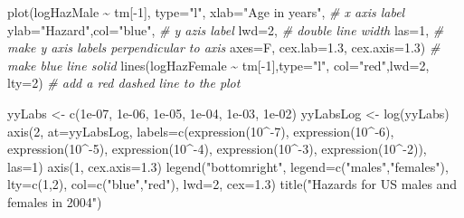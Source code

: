 \documentclass[
]{book}
\newenvironment{Shaded}{\begin{snugshade}}{\end{snugshade}}
\newcommand{\AttributeTok}[1]{\textcolor[rgb]{0.77,0.63,0.00}{#1}}
\newcommand{\CommentTok}[1]{\textcolor[rgb]{0.56,0.35,0.01}{\textit{#1}}}
\newcommand{\DecValTok}[1]{\textcolor[rgb]{0.00,0.00,0.81}{#1}}
\newcommand{\FloatTok}[1]{\textcolor[rgb]{0.00,0.00,0.81}{#1}}
\newcommand{\FunctionTok}[1]{\textcolor[rgb]{0.00,0.00,0.00}{#1}}
\newcommand{\NormalTok}[1]{#1}
\newcommand{\OtherTok}[1]{\textcolor[rgb]{0.56,0.35,0.01}{#1}}
\newcommand{\SpecialCharTok}[1]{\textcolor[rgb]{0.00,0.00,0.00}{#1}}
\newcommand{\StringTok}[1]{\textcolor[rgb]{0.31,0.60,0.02}{#1}}
\theoremstyle{definition}
\theoremstyle{definition}
\theoremstyle{definition}
\theoremstyle{definition}
\theoremstyle{remark}
\begin{document}
\begin{Shaded}
\begin{Highlighting}[]
\FunctionTok{plot}\NormalTok{(logHazMale }\SpecialCharTok{\textasciitilde{}}\NormalTok{ tm[}\SpecialCharTok{{-}}\DecValTok{1}\NormalTok{], }\AttributeTok{type=}\StringTok{"l"}\NormalTok{,}
     \AttributeTok{xlab=}\StringTok{"Age in years"}\NormalTok{,           }\CommentTok{\# x axis label}
     \AttributeTok{ylab=}\StringTok{"Hazard"}\NormalTok{,}\AttributeTok{col=}\StringTok{"blue"}\NormalTok{,      }\CommentTok{\# y azis label}
     \AttributeTok{lwd=}\DecValTok{2}\NormalTok{,                         }\CommentTok{\# double line width}
     \AttributeTok{las=}\DecValTok{1}\NormalTok{,                         }\CommentTok{\# make y axis labels perpendicular to axis}
     \AttributeTok{axes=}\NormalTok{F, }\AttributeTok{cex.lab=}\FloatTok{1.3}\NormalTok{, }\AttributeTok{cex.axis=}\FloatTok{1.3}\NormalTok{)     }\CommentTok{\# make blue line solid}
\FunctionTok{lines}\NormalTok{(logHazFemale }\SpecialCharTok{\textasciitilde{}}\NormalTok{ tm[}\SpecialCharTok{{-}}\DecValTok{1}\NormalTok{],}\AttributeTok{type=}\StringTok{"l"}\NormalTok{, }
      \AttributeTok{col=}\StringTok{"red"}\NormalTok{,}\AttributeTok{lwd=}\DecValTok{2}\NormalTok{, }\AttributeTok{lty=}\DecValTok{2}\NormalTok{)   }\CommentTok{\# add a red dashed line to the plot}

\NormalTok{yyLabs }\OtherTok{\textless{}{-}} \FunctionTok{c}\NormalTok{(}\FloatTok{1e{-}07}\NormalTok{, }\FloatTok{1e{-}06}\NormalTok{, }\FloatTok{1e{-}05}\NormalTok{, }\FloatTok{1e{-}04}\NormalTok{, }\FloatTok{1e{-}03}\NormalTok{, }\FloatTok{1e{-}02}\NormalTok{)}
\NormalTok{yyLabsLog }\OtherTok{\textless{}{-}} \FunctionTok{log}\NormalTok{(yyLabs)}
\FunctionTok{axis}\NormalTok{(}\DecValTok{2}\NormalTok{, }\AttributeTok{at=}\NormalTok{yyLabsLog, }\AttributeTok{labels=}\FunctionTok{c}\NormalTok{(}\FunctionTok{expression}\NormalTok{(}\DecValTok{10}\SpecialCharTok{\^{}{-}}\DecValTok{7}\NormalTok{), }\FunctionTok{expression}\NormalTok{(}\DecValTok{10}\SpecialCharTok{\^{}{-}}\DecValTok{6}\NormalTok{), }
  \FunctionTok{expression}\NormalTok{(}\DecValTok{10}\SpecialCharTok{\^{}{-}}\DecValTok{5}\NormalTok{), }\FunctionTok{expression}\NormalTok{(}\DecValTok{10}\SpecialCharTok{\^{}{-}}\DecValTok{4}\NormalTok{), }\FunctionTok{expression}\NormalTok{(}\DecValTok{10}\SpecialCharTok{\^{}{-}}\DecValTok{3}\NormalTok{), }\FunctionTok{expression}\NormalTok{(}\DecValTok{10}\SpecialCharTok{\^{}{-}}\DecValTok{2}\NormalTok{)), }\AttributeTok{las=}\DecValTok{1}\NormalTok{)  }
\FunctionTok{axis}\NormalTok{(}\DecValTok{1}\NormalTok{, }\AttributeTok{cex.axis=}\FloatTok{1.3}\NormalTok{)   }
\FunctionTok{legend}\NormalTok{(}\StringTok{"bottomright"}\NormalTok{, }\AttributeTok{legend=}\FunctionTok{c}\NormalTok{(}\StringTok{"males"}\NormalTok{,}\StringTok{"females"}\NormalTok{),}
       \AttributeTok{lty=}\FunctionTok{c}\NormalTok{(}\DecValTok{1}\NormalTok{,}\DecValTok{2}\NormalTok{), }\AttributeTok{col=}\FunctionTok{c}\NormalTok{(}\StringTok{"blue"}\NormalTok{,}\StringTok{"red"}\NormalTok{), }\AttributeTok{lwd=}\DecValTok{2}\NormalTok{, }\AttributeTok{cex=}\FloatTok{1.3}\NormalTok{)}
\FunctionTok{title}\NormalTok{(}\StringTok{"Hazards for US males and females in 2004"}\NormalTok{)}


\end{Highlighting}
\end{Shaded}
\end{document}
